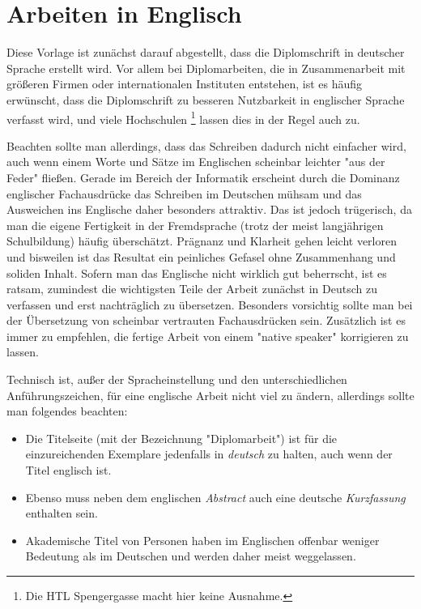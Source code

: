 \section{Arbeiten in Englisch}
\label{sec:englisch}

Diese Vorlage ist zunächst darauf abgestellt, dass die
Diplomschrift in deutscher Sprache erstellt wird. Vor allem bei
Diplomarbeiten, die in Zusammenarbeit mit größeren Firmen oder
internationalen Instituten entstehen, ist es häufig erwünscht,
dass die Diplomschrift zu besseren Nutzbarkeit in englischer
Sprache verfasst wird, und viele Hochschulen%
\footnote{Die HTL Spengergasse macht hier keine Ausnahme.
} 
lassen dies in der Regel auch zu.

Beachten sollte man allerdings, dass das Schreiben dadurch nicht
einfacher wird, auch wenn einem Worte und Sätze im Englischen
scheinbar leichter "aus der Feder" fließen. Gerade im Bereich
der Informatik erscheint durch die Dominanz englischer
Fachausdrücke das Schreiben im Deutschen mühsam und das Ausweichen
ins Englische daher besonders attraktiv. Das ist jedoch
trügerisch, da man die eigene Fertigkeit in der Fremdsprache
(trotz der meist langjährigen Schulbildung) häufig überschätzt.
Prägnanz und Klarheit gehen leicht verloren und bisweilen ist das
Resultat ein peinliches Gefasel ohne Zusammenhang und soliden
Inhalt. Sofern man das Englische nicht wirklich gut beherrscht, ist
es ratsam, zumindest die wichtigsten Teile der Arbeit zunächst in
Deutsch zu verfassen und erst nachträglich zu übersetzen.
Besonders vorsichtig sollte man bei der Übersetzung von scheinbar
vertrauten Fachausdrücken sein. Zusätzlich ist es immer zu
empfehlen, die fertige Arbeit von einem "native speaker"
korrigieren zu lassen.


Technisch ist, außer der Spracheinstellung und den unterschiedlichen Anfüh\-rungszeichen, für eine englische Arbeit nicht viel zu ändern, allerdings sollte man folgendes beachten:
%
\begin{itemize}
\item  Die Titelseite (mit der Bezeichnung "Diplomarbeit") 
ist für die einzureichenden Exemplare jedenfalls in \emph{deutsch} zu halten,
auch wenn der Titel englisch ist. 
\item Ebenso muss neben dem
englischen \emph{Abstract} auch eine deutsche \emph{Kurzfassung}
enthalten sein. %
\item Akademische Titel von Personen haben im Englischen offenbar
weniger Bedeutung als im Deutschen und werden daher meist
weggelassen.
\end{itemize}
